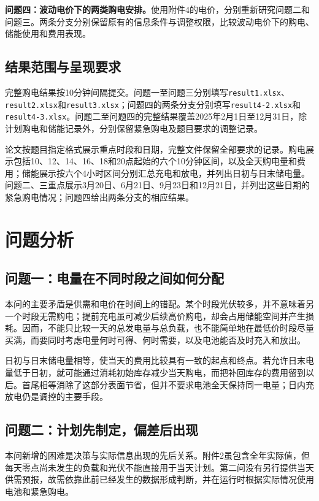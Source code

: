 \textbf{问题四：波动电价下的两类购电安排。}使用附件4的电价，分别重新研究问题二和问题三。两条分支分别保留原有的信息条件与调整权限，比较波动电价下的购电、储能使用和费用表现。

\subsection{结果范围与呈现要求}
完整购电结果按10分钟间隔提交。问题一至问题三分别填写\texttt{result1.xlsx}、\texttt{result2.xlsx}和\texttt{result3.xlsx}；问题四的两条分支分别填写\texttt{result4-2.xlsx}和\texttt{result4-3.xlsx}。问题二至问题四的完整结果覆盖2025年2月1日至12月31日，除计划购电和储能记录外，分别保留紧急购电及题目要求的调整记录。

论文按题目指定格式展示重点时段和日期，完整文件保留全部要求的记录。购电展示包括10、12、14、16、18和20点起始的六个10分钟区间，以及全天购电量和费用；储能展示按六个4小时区间分别汇总充电和放电，并列出日初与日末储电量。问题二、三重点展示3月20日、6月21日、9月23日和12月21日，并列出这些日期的紧急购电情况；问题四给出两条分支的相应结果。

\section{问题分析}
\subsection{问题一：电量在不同时段之间如何分配}
本问的主要矛盾是供需和电价在时间上的错配。某个时段光伏较多，并不意味着另一个时段无需购电；提前充电虽可减少后续高价购电，却会占用储能空间并产生损耗。因而，不能只比较一天的总发电量与总负载，也不能简单地在最低价时段尽量买满，而要同时考虑电量何时可得、何时需要，以及电池能否及时充入和放出。

日初与日末储电量相等，使当天的费用比较具有一致的起点和终点。若允许日末电量低于日初，就可能通过消耗初始库存减少当天购电，而把补回库存的费用留到以后。首尾相等消除了这部分表面节省，但并不要求电池全天保持同一电量；日内充放电仍是调控的主要手段。

\subsection{问题二：计划先制定，偏差后出现}
本问新增的困难是决策与实际信息出现的先后关系。附件2虽包含全年实际值，但每天零点尚未发生的负载和光伏不能直接用于当天计划。第二问没有另行提供当天供需预报，故需依靠此前已经发生的数据形成判断，并在运行时根据实际情况使用电池和紧急购电。

